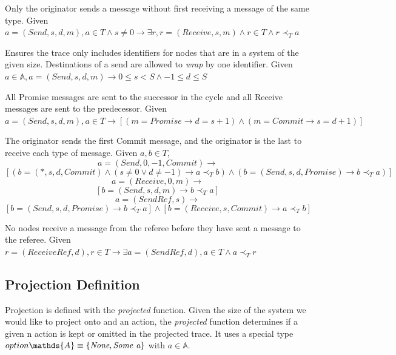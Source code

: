 \documentclass[runningheads]{llncs}
\newcommand{\action}{\mathds{A}}
\newcommand{\happensbefore}{\prec_T}
\begin{document}
\begin{definition} Only the originator sends a message without first receiving a message of the same type.
Given $a = (Send, s, d, m), a \in T \wedge s \neq 0 \longrightarrow \exists r, r = (Receive, s, m) \wedge r \in T \wedge r \happensbefore a$
\end{definition}

\begin{definition} Ensures the trace only includes identifiers for nodes that are in a system of the given size. Destinations of a send are allowed to \emph{wrap} by one identifier. Given $a \in \action, a = (Send, s, d, m) \longrightarrow 0 \le s < S \wedge -1 \le d \le S$
\end{definition}

\begin{definition} All Promise messages are sent to the successor in the cycle and all Receive messages are sent to the predecessor. Given $a = (Send, s, d, m), a \in T \longrightarrow [(m = Promise \longrightarrow d = s + 1) \wedge (m = Commit \longrightarrow s = d + 1)]$
\end{definition}
\begin{definition} The originator sends the first Commit message, and the originator is the last to receive each type of message. Given $a, b \in T$,
$$ 
a = (Send, 0, -1, Commit) \longrightarrow 
$$
$$
[
(b = (*, s, d, Commit) \wedge (s \neq 0 \vee d \neq -1) \longrightarrow a \happensbefore b)
\wedge 
(b = (Send, s, d, Promise) \longrightarrow b \happensbefore a)
]
$$
$$
a = (Receive, 0, m) \longrightarrow 
$$
$$
[
b = (Send, s, d, m) \longrightarrow b \happensbefore a
]
$$
$$
a = (SendRef, s) \longrightarrow 
$$
$$
[
b = (Send, s, d, Promise) \longrightarrow b \happensbefore a
]
\wedge
[
b = (Receive, s, Commit) \longrightarrow a \happensbefore b
]
$$
\end{definition}
\begin{definition} No nodes receive a message from the referee before they have sent a message to the referee. Given $r = (ReceiveRef, d), r \in T \longrightarrow \exists a = (SendRef, d), a \in T \wedge a \happensbefore r$
\end{definition}


\subsection{Projection Definition}
\label{sec:projection}
Projection is defined with the \emph{projected} function. Given the size of the system we would like to project onto and an action, the \emph{projected} function determines if a given n action is kept or omitted in the projected trace. It uses a special type  
$option \action \equiv \{\emph{None}, \emph{Some a}\}$ with $a \in \action$.
\end{document}
